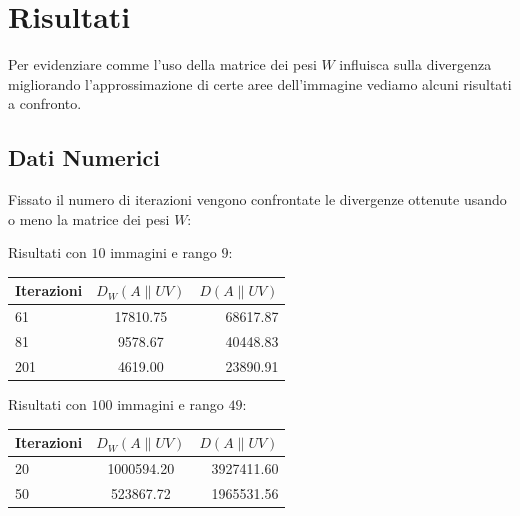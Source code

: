 \documentclass[a4paper]{article} %
\begin{document}

\section{Risultati}
Per evidenziare comme l'uso della matrice dei pesi $W$ influisca sulla divergenza migliorando l'approssimazione di certe aree dell'immagine vediamo alcuni risultati a confronto.

\subsection{Dati Numerici}
Fissato il numero di iterazioni vengono confrontate le divergenze ottenute usando o meno la matrice dei pesi $W$:

\begin{center}
  Risultati con $10$ immagini e rango $9$: \\

  \begin{tabular}{| l | c | r |}
    \hline
    Iterazioni & $D_W(A\lVert UV)$ & $D(A\lVert UV)$ \\
    \hline
    61 & 17810.75 & 68617.87 \\
    81 &  9578.67 & 40448.83 \\
    201 & 4619.00 & 23890.91 \\
    \hline
  \end{tabular}
  \vspace{0.5cm}

  Risultati con $100$ immagini e rango $49$: \\

  \begin{tabular}{| l | c | r |}
    \hline
    Iterazioni & $D_W(A\lVert UV)$ & $D(A\lVert UV)$ \\
    \hline
    20 & 1000594.20 & 3927411.60 \\
    50 &  523867.72 & 1965531.56 \\
    \hline
  \end{tabular}

\end{center}
\end{document}
